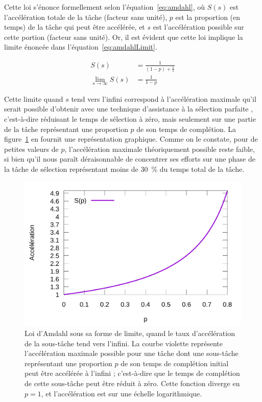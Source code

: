 	Cette loi s'énonce formellement selon l'équation~\ref{eq:amdahl}, où $S(s)$ est l'accélération totale de la tâche (facteur sans unité), $p$ est la proportion (en temps) de la tâche qui peut être accélérée, et $s$ est l'accélération possible sur cette portion (facteur sans unité). Or, il est évident que cette loi implique la limite énoncée dans l'équation~\ref{eq:amdahlLimit}.
	
	\begin{align}
		\label{eq:amdahl}
		S(s) &= \frac{1}{(1-p) + \frac{1}{s}} \\
		\label{eq:amdahlLimit}
		\lim_{s\to\infty} S(s) &= \frac{1}{1-p}
	\end{align}
	
	Cette limite quand $s$ tend vers l'infini correspond à l'accélération maximale qu'il serait possible d'obtenir avec une technique d'assistance à la sélection \og parfaite \fg{}, c'est-à-dire réduisant le temps de sélection à zéro, mais seulement sur une partie de la tâche représentant une proportion $p$ de son temps de complétion. La figure~\ref{fig:amdahl} en fournit une représentation graphique. Comme on le constate, pour de petites valeurs de $p$, l'accélération maximale théoriquement possible reste faible, si bien qu'il nous paraît déraisonnable de concentrer ses efforts sur une phase de la tâche de sélection représentant moins de 30~\%{} du temps total de la tâche.
	
	\begin{figure}[!htb]
		\centering
		\includegraphics[width=\textwidth]{figures/ch4/amdahl}
		\caption[Loi d'Amdahl sous sa forme de limite]{Loi d'Amdahl sous sa forme de limite, quand le taux d'accélération de la sous-tâche tend vers l'infini. La courbe violette représente l'accélération maximale possible pour une tâche dont une sous-tâche représentant une proportion $p$ de son temps de complétion initial peut être accélérée à l'infini ; c'est-à-dire que le temps de complétion de cette sous-tâche peut être réduit à zéro. Cette fonction diverge en $p = 1$, et l'accélération est sur une échelle logarithmique.}
		\label{fig:amdahl}
	\end{figure}
	
